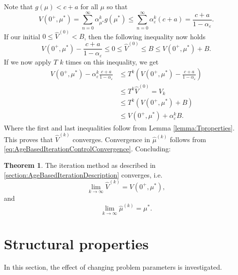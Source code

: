 \documentclass[a4paper]{thesis}
\theoremstyle{definition}
\newtheorem{theorem}{Theorem}[chapter] %
\providecommand{\DIFaddtex}[1]{{\protect\color{blue}\uwave{#1}}} %
\providecommand{\DIFaddbegin}{} %
\providecommand{\DIFaddend}{} %
\providecommand{\DIFadd}[1]{\texorpdfstring{\DIFaddtex{#1}}{#1}} %
\newcommand{\DIFaddincludegraphics}[2][]{{\color{blue}\fbox{\DIFOincludegraphics[#1]{#2}}}} %
\DeclareRobustCommand{\DIFaddbegin}{\DIFOaddbegin \let\includegraphics\DIFaddincludegraphics} %
\DeclareRobustCommand{\DIFaddend}{\DIFOaddend \let\includegraphics\DIFOincludegraphics} %
\begin{document}
	Note that $g(\mu)<c+a$ for all $\mu$ so that 
	$$
	V(0^+,\mu^*)=\sum\limits_{n=0}^\infty \alpha_{\mu^*}^kg(\mu^*)\leq \sum\limits_{n=0}^\infty \alpha_\varepsilon^k(c+a)=\frac{c+a}{1-\alpha_\varepsilon}.
	$$
	If our initial $0\leq \hat{V}^{(0)}<B$, then the following inequality now holds
	$$
	V(0^+,\mu^*)-\frac{c+a}{1-\alpha_\varepsilon}\leq 0\leq \hat{V}^{(0)}\leq B\leq V(0^+,\mu^*)+B.
	$$
	If we now apply $T$ $k$ times on this inequality, we get
	\[\begin{split}
	V(0^+,\mu^*)-\alpha_\varepsilon^k\frac{c+a}{1-\alpha_\varepsilon} &\leq T^k(V(0^+,\mu^*)-\frac{c+a}{1-\alpha_\varepsilon})\\
	&\leq  T^k\hat{V}^{(0)}=V_k\\
	&\leq T^k(V(0^+,\mu^*)+B) \\
	&\leq V(0^+,\mu^*)+\alpha_\varepsilon^kB.
	\end{split}\]
	Where the first and last inequalities follow from Lemma \ref{lemma:Tproperties}.
	This proves that $\hat{V}^{(k)}$ converges.
	Convergence in $\hat\mu^{(k)}$ follows from \eqref{eq:AgeBasedIterationControlConvergence}.
	Concluding:
	\begin{theorem}
		The \DIFaddbegin \DIFadd{policy }\DIFaddend iteration method as described in \DIFaddbegin \DIFadd{section }\DIFaddend \ref*{section:AgeBasedIterationDescription} converges, i.e.
		\[\lim\limits_{k\rightarrow\infty}\hat{V}^{(k)}=V(0^+,\mu^*),\]
		and
		\[\lim\limits_{k\rightarrow\infty}\hat{\mu}^{(k)}=\mu^*.\]
	\end{theorem} \section{Structural properties}\label{section:AgeBasedStructuralProperties}
	In this section, the effect of changing problem parameters is investigated.
	
\end{document}
